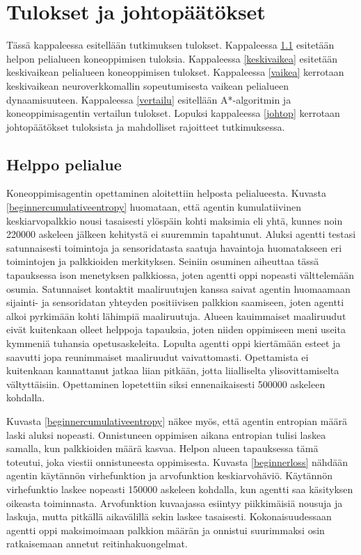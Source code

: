 \documentclass[utf8]{gradu3}
\begin{document}
\chapter{Tulokset ja johtopäätökset}
\label{tulokset}

Tässä kappaleessa esitellään tutkimuksen tulokset. Kappaleessa \ref{helppo} esitetään helpon pelialueen koneoppimisen tuloksia. Kappaleessa \ref{keskivaikea} esitetään keskivaikean pelialueen koneoppimisen tulokset. Kappaleessa \ref{vaikea} kerrotaan keskivaikean neuroverkkomallin sopeutumisesta vaikean pelialueen dynaamisuuteen. Kappaleessa \ref{vertailu} esitellään A*-algoritmin ja koneoppimisagentin vertailun tulokset. Lopuksi kappaleessa \ref{johtop} kerrotaan johtopäätökset tuloksista ja mahdolliset rajoitteet tutkimuksessa.

\section{Helppo pelialue}
\label{helppo}

Koneoppimisagentin opettaminen aloitettiin helposta pelialueesta. Kuvasta \ref{beginnercumulativeentropy} huomataan, että agentin kumulatiivinen keskiarvopalkkio nousi tasaisesti ylöspäin kohti maksimia eli yhtä, kunnes noin 220000 askeleen jälkeen kehitystä ei suuremmin tapahtunut. Aluksi agentti testasi satunnaisesti toimintoja ja sensoridatasta saatuja havaintoja huomatakseen eri toimintojen ja palkkioiden merkityksen. Seiniin osuminen aiheuttaa tässä tapauksessa ison menetyksen palkkiossa, joten agentti oppi nopeasti välttelemään osumia. Satunnaiset kontaktit maaliruutujen kanssa saivat agentin huomaamaan sijainti- ja sensoridatan yhteyden positiivisen palkkion saamiseen, joten agentti alkoi pyrkimään kohti lähimpiä maaliruutuja. Alueen kauimmaiset maaliruudut eivät kuitenkaan olleet helppoja tapauksia, joten niiden oppimiseen meni useita kymmeniä tuhansia opetusaskeleita. Lopulta agentti oppi kiertämään esteet ja saavutti jopa reunimmaiset maaliruudut vaivattomasti. Opettamista ei kuitenkaan kannattanut jatkaa liian pitkään, jotta liialliselta ylisovittamiselta vältyttäisiin. Opettaminen lopetettiin siksi ennenaikaisesti 500000 askeleen kohdalla.

Kuvasta \ref{beginnercumulativeentropy} näkee myös, että agentin entropian määrä laski aluksi nopeasti. Onnistuneen oppimisen aikana entropian tulisi laskea samalla, kun palkkioiden määrä kasvaa. Helpon alueen tapauksessa tämä toteutui, joka viestii onnistuneesta oppimisesta. Kuvasta \ref{beginnerloss} nähdään agentin käytännön virhefunktion ja arvofunktion keskiarvohäviö. Käytännön virhefunktio laskee nopeasti 150000 askeleen kohdalla, kun agentti saa käsityksen oikeasta toiminnasta. Arvofunktion kuvaajassa esiintyy piikkimäisiä nousuja ja laskuja, mutta pitkällä aikavälillä sekin laskee tasaisesti. Kokonaisuudessaan agentti oppi maksimoimaan palkkion määrän ja onnistui suurimmaksi osin ratkaisemaan annetut reitinhakuongelmat.
\end{document}
